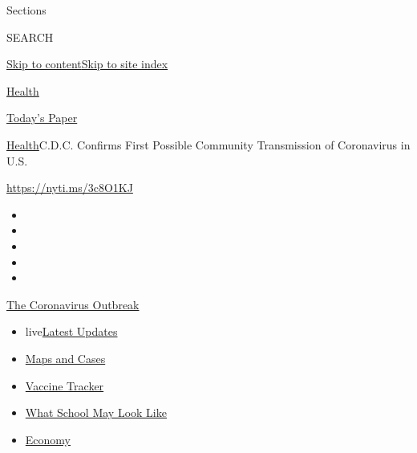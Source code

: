 Sections

SEARCH

\protect\hyperlink{site-content}{Skip to
content}\protect\hyperlink{site-index}{Skip to site index}

\href{https://www.nytimes.com/section/health}{Health}

\href{https://myaccount.nytimes.com/auth/login?response_type=cookie\&client_id=vi}{}

\href{https://www.nytimes.com/section/todayspaper}{Today's Paper}

\href{/section/health}{Health}\textbar{}C.D.C. Confirms First Possible
Community Transmission of Coronavirus in U.S.

\url{https://nyti.ms/3c8O1KJ}

\begin{itemize}
\item
\item
\item
\item
\item
\end{itemize}

\href{https://www.nytimes.com/news-event/coronavirus?action=click\&pgtype=Article\&state=default\&region=TOP_BANNER\&context=storylines_menu}{The
Coronavirus Outbreak}

\begin{itemize}
\tightlist
\item
  live\href{https://www.nytimes.com/2020/08/02/world/coronavirus-updates.html?action=click\&pgtype=Article\&state=default\&region=TOP_BANNER\&context=storylines_menu}{Latest
  Updates}
\item
  \href{https://www.nytimes.com/interactive/2020/us/coronavirus-us-cases.html?action=click\&pgtype=Article\&state=default\&region=TOP_BANNER\&context=storylines_menu}{Maps
  and Cases}
\item
  \href{https://www.nytimes.com/interactive/2020/science/coronavirus-vaccine-tracker.html?action=click\&pgtype=Article\&state=default\&region=TOP_BANNER\&context=storylines_menu}{Vaccine
  Tracker}
\item
  \href{https://www.nytimes.com/interactive/2020/07/29/us/schools-reopening-coronavirus.html?action=click\&pgtype=Article\&state=default\&region=TOP_BANNER\&context=storylines_menu}{What
  School May Look Like}
\item
  \href{https://www.nytimes.com/live/2020/07/31/business/stock-market-today-coronavirus?action=click\&pgtype=Article\&state=default\&region=TOP_BANNER\&context=storylines_menu}{Economy}
\end{itemize}


